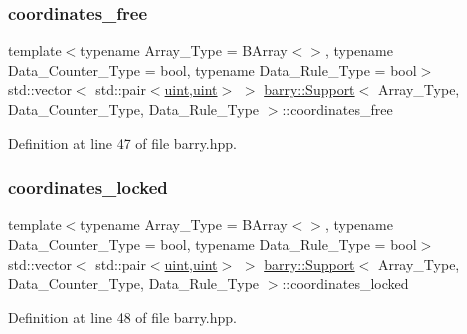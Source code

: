 \subsubsection{\texorpdfstring{coordinates\+\_\+free}{coordinates\_free}}
{\footnotesize\ttfamily template$<$typename Array\+\_\+\+Type  = B\+Array$<$$>$, typename Data\+\_\+\+Counter\+\_\+\+Type  = bool, typename Data\+\_\+\+Rule\+\_\+\+Type  = bool$>$ \\
std\+::vector$<$ std\+::pair$<$\hyperlink{namespacebarry_a11dfc53ddb4672278319aa04f1e09a6c}{uint},\hyperlink{namespacebarry_a11dfc53ddb4672278319aa04f1e09a6c}{uint}$>$ $>$ \hyperlink{classbarry_1_1_support}{barry\+::\+Support}$<$ Array\+\_\+\+Type, Data\+\_\+\+Counter\+\_\+\+Type, Data\+\_\+\+Rule\+\_\+\+Type $>$\+::coordinates\+\_\+free}



Definition at line 47 of file barry.\+hpp.

\mbox{\label{classbarry_1_1_support_a3abcd564b19c7399b596a5b63c72b149}} 
\subsubsection{\texorpdfstring{coordinates\+\_\+locked}{coordinates\_locked}}
{\footnotesize\ttfamily template$<$typename Array\+\_\+\+Type  = B\+Array$<$$>$, typename Data\+\_\+\+Counter\+\_\+\+Type  = bool, typename Data\+\_\+\+Rule\+\_\+\+Type  = bool$>$ \\
std\+::vector$<$ std\+::pair$<$\hyperlink{namespacebarry_a11dfc53ddb4672278319aa04f1e09a6c}{uint},\hyperlink{namespacebarry_a11dfc53ddb4672278319aa04f1e09a6c}{uint}$>$ $>$ \hyperlink{classbarry_1_1_support}{barry\+::\+Support}$<$ Array\+\_\+\+Type, Data\+\_\+\+Counter\+\_\+\+Type, Data\+\_\+\+Rule\+\_\+\+Type $>$\+::coordinates\+\_\+locked}



Definition at line 48 of file barry.\+hpp.

\mbox{\label{classbarry_1_1_support_a5de08029a7262ba86df728c8b8427999}} 
